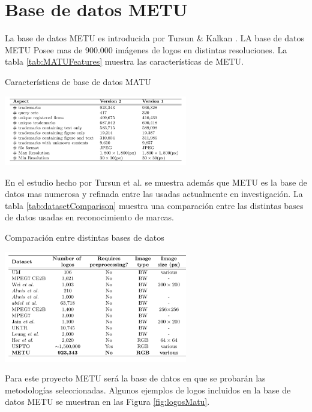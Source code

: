 \documentclass[conference]{IEEEtran}
\begin{document}
\section{Base de datos METU}
La base de datos METU es introducida por Tursun \& Kalkan \cite{metuV1}. LA base de datos METU Posee mas de 900.000 imágenes de logos en distintas resoluciones. La tabla \ref{tab:MATUFeatures} muestra las características de METU.
\begin{table}[h!]
	\caption{Características de base de datos MATU}
	\includegraphics[width=8cm]{images/caracteristicasMatu}
	\label{tab:MATUFeatures}
\end{table}

En el estudio hecho por Tursun et al. \cite{metuV2} se muestra además que METU es la base de datos mas numerosa y refinada entre las usadas actualmente en investigación. La tabla \ref{tab:datasetComparison} muestra una comparación entre las distintas bases de datos usadas en reconocimiento de marcas.
\begin{table}[h!]
	\caption{Comparación entre distintas bases de datos}
	\includegraphics[width=8cm]{images/comparasciondataset}
	\label{tab:datasetComparison}
\end{table}

Para este proyecto METU será la base de datos en que se probarán las metodologías seleccionadas. Algunos ejemplos de logos incluidos en la base de datos METU se muestran en las Figura \ref{fig:logosMatu}.
\end{document}
